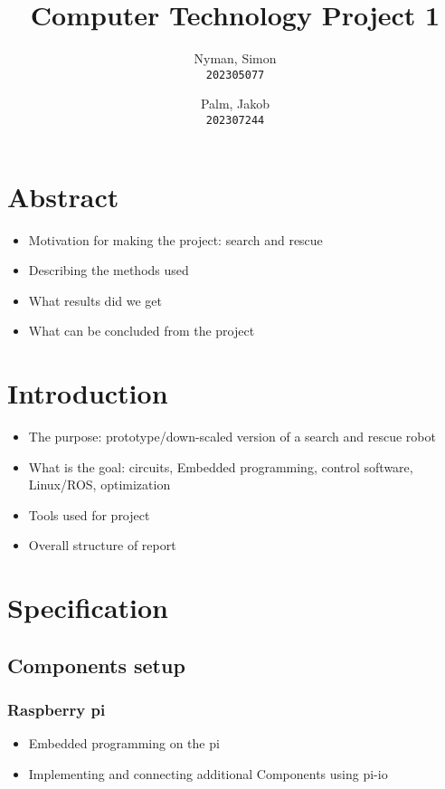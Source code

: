 \documentclass{article}
\author{
    Nyman, Simon\\
    \texttt{202305077}
    \and
    Palm, Jakob\\
    \texttt{202307244}
}
\begin{document}
\pagestyle{plain}
\title{Computer Technology Project 1}
\maketitle

    \section*{Abstract}
        \begin{itemize}
            \item Motivation for making the project: search and rescue
            \item Describing the methods used
            \item What results did we get
            \item What can be concluded from the project
        \end{itemize}

    \section*{Introduction}
        \begin{itemize}
            \item The purpose: prototype/down-scaled version of a search and rescue robot
            \item What is the goal: circuits, Embedded programming, control software, Linux/ROS, optimization
            \item Tools used for project
            \item Overall structure of report
        \end{itemize}

    \section*{Specification}
        \subsection*{Components setup}
            \subsubsection*{Raspberry pi}
                \begin{itemize}
                    \item Embedded programming on the pi
                    \item Implementing and connecting additional Components using pi-io 
                \end{itemize}
\end{document}
